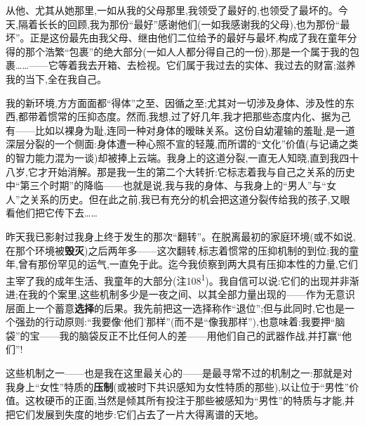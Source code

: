 从他、尤其从她那里,一如从我的父母那里,我领受了最好的,也领受了最坏的。今天,隔着长长的回顾,我为那份“最好”感谢他们(一如我感谢我的父母),也为那份“最坏”。正是这份最先由我父母、继由他们二位给予的最好与最坏,构成了我在童年分得的那个浩繁“包裹”的绝大部分(一如人人都分得自己的一份),那是一个属于我的包裹……——它等着我去开箱、去检视。它们属于我过去的实体、我过去的财富;滋养我的当下,全在我自己。

我的新环境,方方面面都“得体”之至、因循之至;尤其对一切涉及身体、涉及性的东西,都带着惯常的压抑态度。\dmark{}然而,我想,过了好几年,我才把那些态度内化、据为己有——比如以裸身为耻,连同一种对身体的暧昧关系。这份自幼灌输的羞耻,是一道深层分裂的一个侧面:身体遭一种心照不宣的轻蔑,而所谓的“文化”价值(与记诵之类的智力能力混为一谈)却被捧上云端。我身上的这道分裂,一直无人知晓,直到我四十八岁,它才开始消解。那是我一生的第二个大转折:它标志着我与自己之关系的历史中“第三个时期”的降临——也就是说,我与我的身体、与我身上的“男人”与“女人”之关系的历史。但在此之前,我已有充分的机会把这道分裂传给我的孩子,又眼看他们把它传下去……

昨天我已影射过我身上终于发生的那次“翻转”。在脱离最初的家庭环境(或不如说,在那个环境被\textbf{毁灭})之后两年多——这次翻转,标志着惯常的压抑机制的到位;我的童年,曾有那份罕见的运气,一直免于此。迄今我侦察到两大具有压抑本性的力量,它们主宰了我的成年生活、我童年的大部分(注108\textsuperscript{1})。我自信可以说:它们的出现并非渐进;在我的个案里,这些机制多少是一夜之间、以其全部力量出现的——作为无意识层面上一个蓄意\textbf{选择}的后果。我先前把这一选择称作“退位”;但与此同时,它也是一个强劲的行动原则:“我要像‘他们’那样”(而不是“像我那样”),也意味着:我要押“脑袋”的宝——我的脑袋反正不比任何人的差——用他们自己的武器作战,并打赢“他们”!

这些机制之一——也是我在这里最关心的——是最寻常不过的机制之一:那就是对我身上“女性”特质的\textbf{压制}(或被时下共识感知为女性特质的那些),以让位于“男性”价值。这枚硬币的正面,当然是倾其所有投注于那些被感知为“男性”的特质与才能,并把它们发展到失度的地步:它们占去了一片大得离谱的天地。

